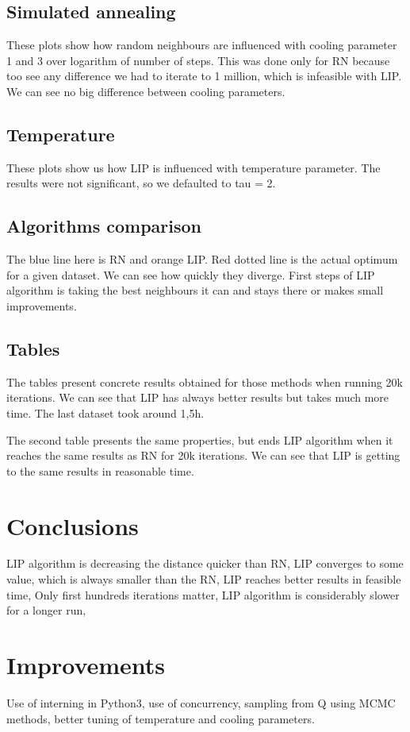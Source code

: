 \documentclass{article}
\begin{document}
		\subsection{Simulated annealing}
			These plots show how random neighbours are influenced with cooling parameter 1 and 3 over logarithm of number of steps. This was done only for RN because too see any difference we had to iterate to 1 million, which is infeasible with LIP. We can see no big difference between cooling parameters.
			
		\subsection{Temperature}
			These plots show us how LIP is influenced with temperature parameter. The results were not significant, so we defaulted to tau = 2.
			
		\subsection{Algorithms comparison}
			The blue line here is RN and orange LIP. Red dotted line is the actual optimum for a given dataset. We can see how quickly they diverge. First steps of LIP algorithm is taking the best neighbours it can and stays there or makes small improvements. 
			
		\subsection{Tables}
			The tables present concrete results obtained for those methods when running 20k iterations. We can see that LIP has always better results but takes much more time. The last dataset took around 1,5h.
			
			The second table presents the same properties, but ends LIP algorithm when it reaches the same results as RN for 20k iterations. We can see that LIP is getting to the same results in reasonable time.
			
	\section{Conclusions}	
		LIP algorithm is decreasing the distance quicker than RN, LIP converges to some value, which is always smaller than the RN, LIP reaches better results in feasible time, Only first hundreds iterations matter, LIP algorithm is considerably slower for a longer run,
		
	\section{Improvements}
		Use of interning in Python3, use of concurrency, sampling from Q using MCMC methods, better tuning of temperature and cooling parameters.
		
\end{document}
